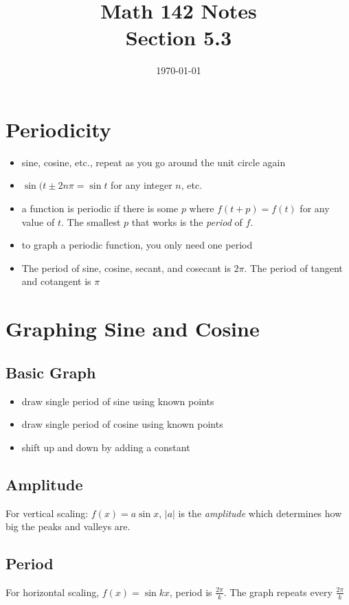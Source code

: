 \documentclass{exam}
\title{Math 142 Notes \\ Section 5.3}
\date{\today}
\begin{document}
  \maketitle
  \tableofcontents

  \section{Periodicity}
  \begin{itemize}
    \item sine, cosine, etc., repeat as you go around the unit circle again
    \item $\sin(t \pm 2n \pi = \sin t$ for any integer $n$, etc.
    \item a function is periodic if there is some $p$ where $f(t + p) = f(t)$ for any value of $t$.  The smallest
      $p$ that works is the {\em period} of $f$.
    \item to graph a periodic function, you only need one period
    \item The period of sine, cosine, secant, and cosecant is $2 \pi$.  The period of tangent and cotangent is
      $\pi$
  \end{itemize}

  \section{Graphing Sine and Cosine} 

  \subsection{Basic Graph}
  \begin{itemize}
    \item draw single period of sine using known points
    \item draw single period of cosine using known points
    \item shift up and down by adding a constant
  \end{itemize}

  \subsection{Amplitude}
  For vertical scaling: $f(x) = a \sin x$, $|a|$ is the {\em amplitude } which determines how big the peaks and valleys
  are.

  \subsection{Period}
  For horizontal scaling, $f(x) = \sin kx$, period is $\frac{2 \pi}{k}$.  The graph repeats every 
  $\frac{2 \pi}{k}$
\end{document}
